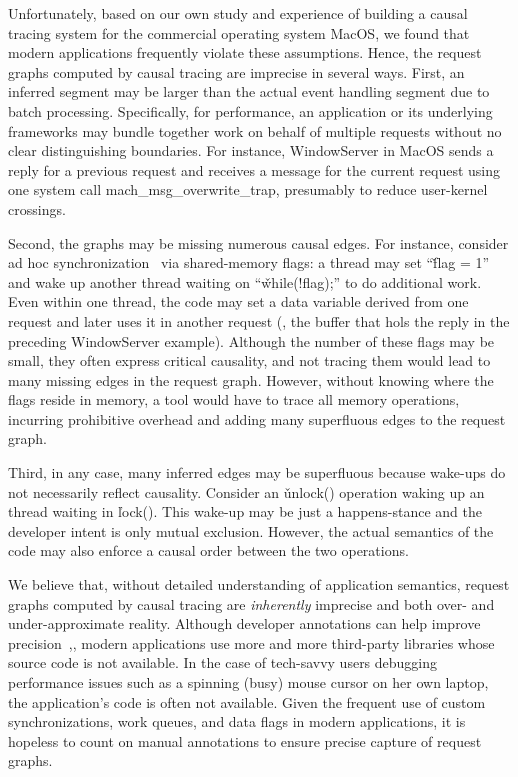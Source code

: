 Unfortunately, based on our own study and experience of building a causal
tracing system for the commercial operating system MacOS, we found that modern
applications frequently violate these assumptions. Hence, the request
graphs computed by causal tracing are imprecise in several ways.  First, an
inferred segment may be larger than the actual event handling segment due
to batch processing.  Specifically, for performance, an application or its
underlying frameworks may bundle together work on behalf of multiple requests
without no clear distinguishing boundaries.  For instance, WindowServer
in MacOS sends a reply for a previous request and receives a
message for the current request using one system call mach\_msg\_overwrite\_trap,
presumably to reduce user-kernel crossings.

Second, the graphs may be missing numerous causal edges.  For instance,
consider ad hoc synchronization~\cite{xiong2010ad}
via shared-memory flags: a
thread may set ``\v{flag = 1}'' and wake up another thread waiting on
``\v{while(!flag);}'' to do additional work.  Even within one thread,
the code may set a data variable derived from one request and later uses
it in another request (\eg, the buffer that hols the reply in the
preceding WindowServer example). Although the number of these
flags may be small, they often express critical causality, and not tracing
them would lead to many missing edges in the request graph.  However,
without knowing where the flags reside in memory, a tool would have to
trace all memory operations, incurring prohibitive overhead and
adding many superfluous edges to the request graph.

Third, in any case, many inferred edges may be superfluous because wake-ups do not
necessarily reflect causality.  Consider an \v{unlock()} operation waking
up an thread waiting in \v{lock()}.  This wake-up may be just a
happens-stance and the developer intent is only mutual exclusion.
However, the actual semantics of the code may also enforce a causal order
between the two operations.

We believe that, without detailed understanding of application semantics,
request graphs computed by causal tracing are \emph{inherently} imprecise and
both over- and under-approximate reality.  Although developer annotations can
help improve precision~\cite{barham2004using},\cite{reynolds2006pip}, modern
applications use more and more third-party libraries whose source code is not
available.  In the case of tech-savvy users debugging performance issues such
as a spinning (busy) mouse cursor on her own laptop, the application's code is
often not available.  Given the frequent use of custom synchronizations, work
queues, and data flags in modern applications, it is hopeless to count on
manual annotations to ensure precise capture of request graphs.


